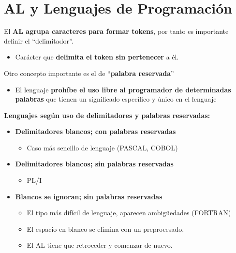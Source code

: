 \documentclass[12pt]{report} %
\begin{document}
\section{AL y Lenguajes de Programación}

El \textbf{AL agrupa caracteres para formar tokens}, por tanto es
importante definir el ``delimitador''.

\begin{itemize}

\item
  Carácter que \textbf{delimita el token sin pertenecer} a él.
\end{itemize}

Otro concepto importante es el de ``\textbf{palabra reservada}''

\begin{itemize}

\item
  El lenguaje \textbf{prohíbe el uso libre al programador de
  determinadas palabras} que tienen un significado específico y único en
  el lenguaje
\end{itemize}

\textbf{Lenguajes según uso de delimitadores y palabras reservadas:}

\begin{itemize}

\item
  \textbf{Delimitadores blancos; con palabras reservadas}

  \begin{itemize}
  
  \item
    Caso más sencillo de lenguaje (PASCAL, COBOL)
  \end{itemize}
\item
  \textbf{Delimitadores blancos; sin palabras reservadas}

  \begin{itemize}
  
  \item
    PL/I
  \end{itemize}
\item
  \textbf{Blancos se ignoran; sin palabras reservadas}

  \begin{itemize}
  
  \item
    El tipo más difícil de lenguaje, aparecen ambigüedades (FORTRAN)
  \item
    El espacio en blanco se elimina con un preprocesado.
  \item
    El AL tiene que retroceder y comenzar de nuevo.
  \end{itemize}
\end{itemize}
\end{document}
